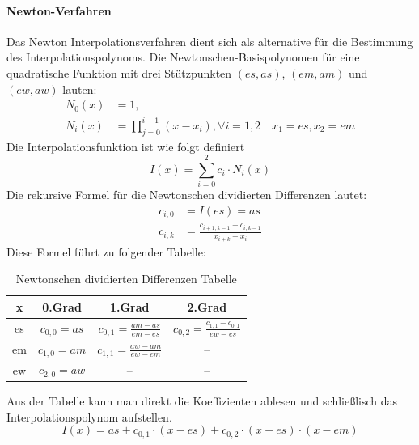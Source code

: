 \documentclass[course=erap]{aspdoc}
\begin{document}
\paragraph{Newton-Verfahren} 
Das Newton Interpolationsverfahren dient sich als alternative für die Bestimmung des Interpolationspolynoms. 
Die Newtonschen-Basispolynomen für eine quadratische Funktion mit drei Stützpunkten $(es, as)$, $(em, am)$ und $(ew, aw)$ lauten:\
\begin{align*}
   N_0(x)&=1, \\
   N_i(x)&= \prod_{j=0}^{i-1} (x-x_i) , \forall i=1,2 \quad x_1 = es, x_2 = em
\end{align*}
Die Interpolationsfunktion ist wie folgt definiert
\[
I(x) = \sum_{i=0}^{2} c_i \cdot N_i(x)
\]
Die rekursive Formel für die Newtonschen dividierten Differenzen lautet:
\begin{align*}
    c_{i,0} &= I(es) = as \\
    c_{i,k} &= \frac{c_{i+1,k-1} - c_{i,k-1}}{x_{i+k} - x_i}
\end{align*}
Diese Formel führt zu folgender Tabelle:
\begin{table}[H]
    \centering
    \begin{tabular}{|c|c|c|c|}
        \hline
        x &  0.Grad & 1.Grad & 2.Grad\\
        \hline
        es & $c_{0,0} = as $ & $c_{0,1} = \frac{am-as}{em-es}$ & $c_{0,2} = \frac{c_{1,1} - c_{0,1}}{ew-es}$\\
        \hline
        em & $c_{1,0} = am $ &$c_{1,1} = \frac{aw - am}{ew-em}$ & -- \\
        \hline
        ew & $c_{2,0} = aw $ & -- & -- \\
        \hline
    \end{tabular}
    \caption{Newtonschen dividierten Differenzen Tabelle}
    \label{tab:my_label}
\end{table}

Aus der Tabelle kann man direkt die Koeffizienten ablesen und schließlisch das Interpolationspolynom 
aufstellen.
\[
    I(x) = as + c_{0,1}\cdot(x-es)+ c_{0,2}\cdot(x-es)\cdot(x-em)
\]
\end{document}
